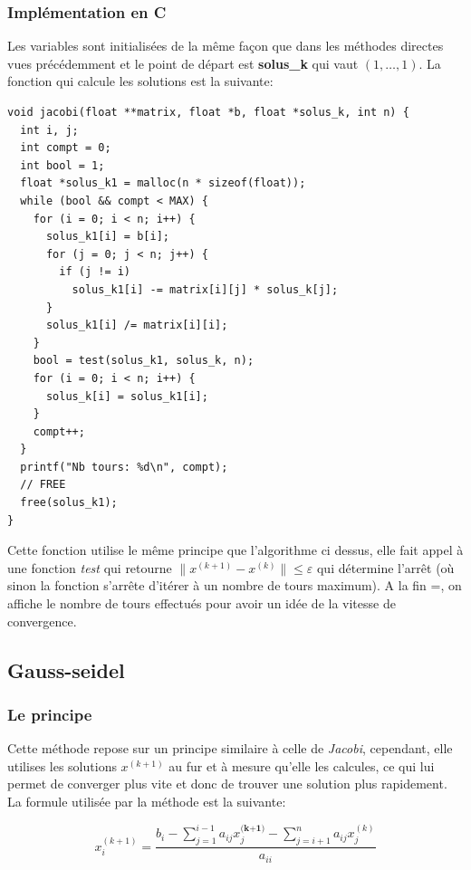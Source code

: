 \documentclass[a4paper]{article}
\begin{document}
\subsubsection{Implémentation en C}

Les variables sont initialisées de la même façon que dans les méthodes directes
vues précédemment et le point de départ est \textbf{solus\_k} qui vaut $(1,
\dots, 1)$. La fonction qui calcule les solutions est la suivante:

\begin{lstlisting}
void jacobi(float **matrix, float *b, float *solus_k, int n) {
  int i, j;
  int compt = 0;
  int bool = 1;
  float *solus_k1 = malloc(n * sizeof(float));
  while (bool && compt < MAX) {
    for (i = 0; i < n; i++) {
      solus_k1[i] = b[i];
      for (j = 0; j < n; j++) {
        if (j != i)
          solus_k1[i] -= matrix[i][j] * solus_k[j];
      }
      solus_k1[i] /= matrix[i][i];
    }
    bool = test(solus_k1, solus_k, n);
    for (i = 0; i < n; i++) {
      solus_k[i] = solus_k1[i];
    }
    compt++;
  }
  printf("Nb tours: %d\n", compt);
  // FREE
  free(solus_k1);
}
\end{lstlisting}

Cette fonction utilise le même principe que l'algorithme ci dessus, elle
fait appel à une fonction \textit{test} qui retourne $\parallel x^{(k+1)} -
x^{(k)} \parallel \leqslant \varepsilon$ qui détermine l'arrêt (où sinon la
fonction s'arrête d'itérer à un nombre de tours maximum). A la fin =, on affiche
le nombre de tours effectués pour avoir un idée de la vitesse de convergence.

\subsection{Gauss-seidel}

\subsubsection{Le principe}

Cette méthode repose sur un principe similaire à celle de \textit{Jacobi},
cependant, elle utilises les solutions $x^{(k+1)}$ au fur et à mesure qu'elle
les calcules, ce qui lui permet de converger plus vite et donc de trouver une
solution plus rapidement. La formule utilisée par la méthode est la suivante:

\[x_{i}^{(k+1)} = \frac{b_{i} - \sum_{j=1}^{i-1}a_{ij}x_{j}^{\textbf{(k+1)}} -
  \sum_{j=i+1}^{n}a_{ij}x_{j}^{(k)}}{a_{ii}}\]
\end{document}
